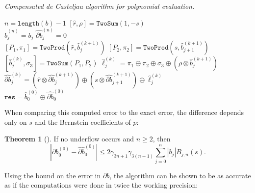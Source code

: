 \documentclass[letterpaper,10pt]{article}
\theoremstyle{definition}
\newtheorem{theorem}{Theorem}
\begin{document}
\begin{algorithm}[H]
  \caption{\textit{Compensated de Casteljau algorithm for polynomial evaluation.}}

  \begin{algorithmic}
      \State \(n = \texttt{length}(b) - 1\)
      \State \(\left[\widehat{r}, \rho\right] = \mathtt{TwoSum}(1, -s)\)
      \\
        \State \(\widehat{b}_j^{(n)} = b_j\)
        \State \(\widehat{\partial b}_j^{(n)} = 0\)
      \EndFor
      \\
          \State \(\left[P_1, \pi_1\right] = \mathtt{TwoProd}\left(
              \widehat{r}, \widehat{b}_j^{(k + 1)}\right)\)
          \State \(\left[P_2, \pi_2\right] = \mathtt{TwoProd}\left(
              s, \widehat{b}_{j + 1}^{(k + 1)}\right)\)
          \State \(\left[\widehat{b}_j^{(k)}, \sigma_3\right] =
              \mathtt{TwoSum}(P_1, P_2)\)
          \State \(\widehat{\ell}_j^{(k)} = \pi_1 \oplus \pi_2 \oplus \sigma_3
              \oplus \left(\rho \otimes \widehat{b}_j^{(k + 1)}\right)\)
          \State \(\widehat{\partial b}_j^{(k)} =
              \left(\widehat{r} \otimes
              \widehat{\partial b}_j^{(k + 1)}\right) \oplus
              \left(s \otimes \widehat{\partial b}_{j + 1}^{(k + 1)}
              \right) \oplus
              \widehat{\ell}_j^{(k)}\)
        \EndFor
      \EndFor
      \\
      \State \(\mathtt{res} = \widehat{b}_0^{(0)} \oplus
          \widehat{\partial b}_0^{(0)}\)
    \EndFunction
  \end{algorithmic}
\end{algorithm}

\noindent  When comparing this computed error to the exact error, the
difference depends only on \(s\) and the Bernstein
coefficients of \(p\):

\begin{theorem}[\cite{Jiang2010}]
  If no underflow occurs and \(n \geq 2\), then
  \begin{equation}
    \left|\partial b_0^{(0)} - \widehat{\partial b}_0^{(0)}\right| \leq
    2 \gamma_{3n + 1} \gamma_{3(n - 1)}
    \sum_{j = 0}^n \left|b_j\right| B_{j, n}(s).
  \end{equation}
\end{theorem}

\noindent Using the bound on the error in \(\partial b\), the algorithm can
be shown to be as accurate as if the computations were done in twice
the working precision:
\end{document}
